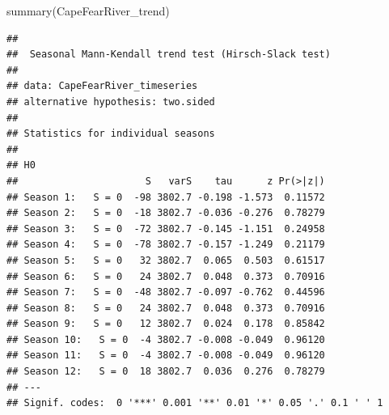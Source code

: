 \documentclass[
  12pt,
]{article}
\newenvironment{Shaded}{\begin{snugshade}}{\end{snugshade}}
\newcommand{\AttributeTok}[1]{\textcolor[rgb]{0.77,0.63,0.00}{#1}}
\newcommand{\CommentTok}[1]{\textcolor[rgb]{0.56,0.35,0.01}{\textit{#1}}}
\newcommand{\DecValTok}[1]{\textcolor[rgb]{0.00,0.00,0.81}{#1}}
\newcommand{\FunctionTok}[1]{\textcolor[rgb]{0.00,0.00,0.00}{#1}}
\newcommand{\NormalTok}[1]{#1}
\newcommand{\OtherTok}[1]{\textcolor[rgb]{0.56,0.35,0.01}{#1}}
\newcommand{\SpecialCharTok}[1]{\textcolor[rgb]{0.00,0.00,0.00}{#1}}
\newcommand{\StringTok}[1]{\textcolor[rgb]{0.31,0.60,0.02}{#1}}
\begin{document}
\begin{Shaded}
\begin{Highlighting}[]
\FunctionTok{summary}\NormalTok{(CapeFearRiver\_trend)}
\end{Highlighting}
\end{Shaded}

\begin{verbatim}
## 
##  Seasonal Mann-Kendall trend test (Hirsch-Slack test)
## 
## data: CapeFearRiver_timeseries
## alternative hypothesis: two.sided
## 
## Statistics for individual seasons
## 
## H0
##                      S   varS    tau      z Pr(>|z|)  
## Season 1:   S = 0  -98 3802.7 -0.198 -1.573  0.11572  
## Season 2:   S = 0  -18 3802.7 -0.036 -0.276  0.78279  
## Season 3:   S = 0  -72 3802.7 -0.145 -1.151  0.24958  
## Season 4:   S = 0  -78 3802.7 -0.157 -1.249  0.21179  
## Season 5:   S = 0   32 3802.7  0.065  0.503  0.61517  
## Season 6:   S = 0   24 3802.7  0.048  0.373  0.70916  
## Season 7:   S = 0  -48 3802.7 -0.097 -0.762  0.44596  
## Season 8:   S = 0   24 3802.7  0.048  0.373  0.70916  
## Season 9:   S = 0   12 3802.7  0.024  0.178  0.85842  
## Season 10:   S = 0  -4 3802.7 -0.008 -0.049  0.96120  
## Season 11:   S = 0  -4 3802.7 -0.008 -0.049  0.96120  
## Season 12:   S = 0  18 3802.7  0.036  0.276  0.78279  
## ---
## Signif. codes:  0 '***' 0.001 '**' 0.01 '*' 0.05 '.' 0.1 ' ' 1
\end{verbatim}

\begin{Shaded}
\end{Shaded}
\end{document}
